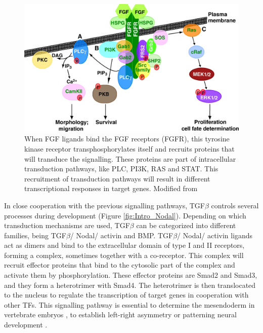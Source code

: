 \begin{figure}[ht!]
\centering
\includegraphics[width=1\textwidth]{Figures/Intro/Intro_FGF.jpeg}
\caption[FGF pathway]{When FGF ligands bind the FGF receptors (FGFR), this tyrosine kinase receptor transphosphorylates itself and recruits proteins that will transduce the signalling. These proteins are part of intracellular transduction pathways, like PLC, PI3K, RAS and STAT. This recruitment of transduction pathways will result in different transcriptional responses in target genes. Modified from \parencite{dorey_fgf_2010}}
\label{fig:Intro_FGF}
\end{figure} 


In close cooperation with the previous signalling pathways, TGF$\beta$ controls several processes during development \parencite{jia_tgf_2021} (Figure \ref{fig:Intro_Nodal}). Depending on which transduction mechanisms are used, TGF$\beta$ can be categorized into different families, being TGF$\beta$/ Nodal/ activin and BMP. TGF$\beta$/ Nodal/ activin ligands act as dimers and bind to the extracellular domain of type I and II receptors, forming a complex, sometimes together with a co-receptor. This complex will recruit effector proteins that bind to the cytosolic part of the complex and activate them by phosphorylation. These effector proteins are Smad2 and Smad3, and they form a heterotrimer with Smad4. The heterotrimer is then translocated to the nucleus to regulate the transcription of target genes in cooperation with other TFs. This signalling pathway is essential to determine the mesendoderm in vertebrate embryos \parencite{montague_vg1-nodal_2017}, to establish left-right asymmetry \parencite{hamada_diversity_2020} or patterning neural development \parencite{shen_nodal_2007}.

